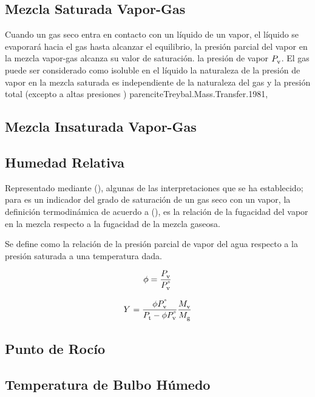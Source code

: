 \subsection{Mezcla Saturada Vapor-Gas}
  Cuando un gas seco entra en contacto con un líquido de un vapor, el líquido se evaporará hacia el gas hasta alcanzar el equilibrio, la presión parcial del vapor \performVapor{} en la mezcla vapor-gas alcanza su valor de saturación. la presión de vapor $P_{\text{v}{}{}}^{}$. El gas puede ser considerado como isoluble  en el líquido la naturaleza de la presión de vapor en la mezcla saturada es independiente de la naturaleza del gas y la presión total (excepto a altas presiones )  parencite{Treybal.Mass.Transfer.1981},   

\subsection{Mezcla Insaturada Vapor-Gas}

\subsection{Humedad Relativa}
    Representado mediante (\symRelativeHumidity), algunas de las {\color{blue!40!green} interpretaciones} que se ha establecido; para \parencite{Cusi.William} es un indicador del grado de saturación de un gas seco con un vapor,
    la definición termodinámica de acuerdo a (), es la relación de la fugacidad del vapor en la mezcla respecto a la fugacidad de la mezcla gaseosa.

    Se define como la relación de la presión parcial de vapor del agua respecto a la presión saturada a una temperatura dada.

    \begin{equation}
      \phi = \frac{P_{\text{v}}^{}}{P_{\text{v}}^{\text{\degree}}}
    \end{equation}

    \begin{equation}
      \eqAbsoluteHumidityDevelop
    \end{equation}
    \namingEqAbsoluteHumidityDevelop

\subsection{Punto de Rocío}
\subsection{Temperatura de Bulbo Húmedo}
